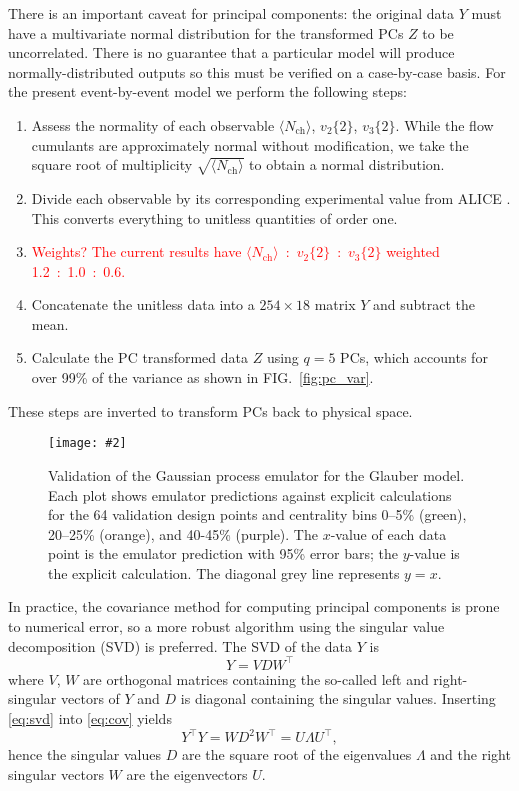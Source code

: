\documentclass[aps,prc,reprint,amsmath]{revtex4-1}
\newcommand{\todo}[1]{\textcolor{red}{#1}}
\newcommand{\widefig}[3][t]{
  \begin{figure*}[#1]
    \texttt{[image: \#2]}
    \caption{\label{fig:#2}#3}
  \end{figure*}
}
\newcommand{\avg}[1]{\langle #1 \rangle}
\newcommand{\nch}{N_\text{ch}}
\newcommand{\vnk}[2]{v_#1\{#2\}}
\newcommand{\tran}{^\intercal}
\begin{document}
There is an important caveat for principal components:
the original data $Y$ must have a multivariate normal distribution for the transformed PCs $Z$ to be uncorrelated.
There is no guarantee that a particular model will produce normally-distributed outputs so this must be verified on a case-by-case basis.
For the present event-by-event model we perform the following steps:
\begin{enumerate}
  \item Assess the normality of each observable $\avg\nch$, $\vnk 2 2$, $\vnk 3 2$.
    While the flow cumulants are approximately normal without modification, we take the square root of multiplicity $\sqrt{\avg\nch}$ to obtain a normal distribution.
  \item Divide each observable by its corresponding experimental value from ALICE \cite{Abelev:2014mda}.
    This converts everything to unitless quantities of order one.
  \item \todo{Weights?  The current results have $\avg\nch$~:~$\vnk 2 2$~:~$\vnk 3 2$ weighted 1.2~:~1.0~:~0.6.}
  \item Concatenate the unitless data into a $254 \times 18$ matrix $Y$ and subtract the mean.
  \item Calculate the PC transformed data $Z$ using $q = 5$ PCs, which accounts for over 99\% of the variance as shown in FIG.~\ref{fig:pc_var}.
\end{enumerate}
These steps are inverted to transform PCs back to physical space.

\widefig{validation}{
  Validation of the Gaussian process emulator for the Glauber model.
  Each plot shows emulator predictions against explicit calculations for the 64 validation design points and centrality bins 0--5\% (green), 20--25\% (orange), and 40-45\% (purple).
  The $x$-value of each data point is the emulator prediction with 95\% error bars; the $y$-value is the explicit calculation.
  The diagonal grey line represents $y = x$.
}

In practice, the covariance method for computing principal components is prone to numerical error, so a more robust algorithm using the singular value decomposition (SVD) is preferred.
The SVD of the data $Y$ is
\begin{equation}
  Y = VDW\tran
  \label{eq:svd}
\end{equation}
where $V$, $W$ are orthogonal matrices containing the so-called left and right-singular vectors of $Y$ and $D$ is diagonal containing the singular values.
Inserting \eqref{eq:svd} into \eqref{eq:cov} yields
\begin{equation}
  Y\tran Y = W D^2 W\tran = U \Lambda U\tran,
\end{equation}
hence the singular values $D$ are the square root of the eigenvalues $\Lambda$ and the right singular vectors $W$ are the eigenvectors $U$.
\end{document}
